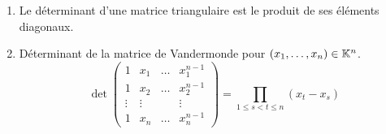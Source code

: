 \begin{defprop}
    \begin{enumerate}
        \item Le déterminant d’une matrice triangulaire est le produit de ses éléments diagonaux.
        \item Déterminant de la matrice de Vandermonde pour \((x_1, \dots  , x_n) \in  \mathbb{K}^n \).
        \[\det\begin{pmatrix}
            1 & x_1 & \dots & x^{n-1}_1\\
            1 & x_2 & \dots & x^{n-1}_2\\
            \vdots & \vdots &&\vdots \\
            1 & x_n &\dots&  x^{n-1}_n 
            \end{pmatrix} = \prod_{1\leq s<t\leq n}(x_t - x_s)
        \]
    \end{enumerate}
\end{defprop}
